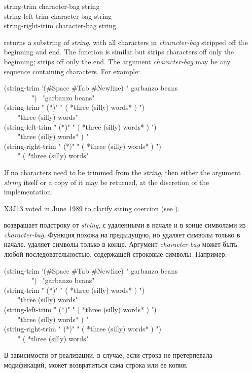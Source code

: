 \begin{defun}[Function]
string-trim character-bag string \\
string-left-trim character-bag string \\
string-right-trim character-bag string

 returns a substring of \emph{string}, with all characters in
\emph{character-bag} stripped off the beginning and end.
The function  is similar but strips characters
off only the beginning;  strips off only the end.
The argument \emph{character-bag} may be any sequence containing
characters.
For example:
\begin{lisp}
(string-trim '(\#{\Xbackslash}Space \#{\Xbackslash}Tab \#{\Xbackslash}Newline) " garbanzo beans \\
~~~~~~~~") \EV\ "garbanzo beans" \\
(string-trim " (*)" " ( *three (silly) words* ) ") \\
~~~\EV\ "three (silly) words" \\
(string-left-trim " (*)" " ( *three (silly) words* ) ") \\
~~~\EV\ "three (silly) words* ) " \\
(string-right-trim " (*)" " ( *three (silly) words* ) ") \\
~~~\EV\ " ( *three (silly) words"
\end{lisp}
If no characters need to be trimmed from the \emph{string},
then either the argument \emph{string} itself or a copy of it may
be returned, at the discretion of the implementation.

\begin{newer}
X3J13 voted in June 1989 
to clarify string coercion (see ).
\end{newer}

 возвращает подстроку от \emph{string}, с удаленными в начале и
в конце символами из \emph{character-bag}.
Функция  похожа на предыдущую, но удаляет символы только в
начале.
 удаляет символы только в
конце.
Аргумент \emph{character-bag} может быть любой последовательностью, содержащей
строковые символы.
Например:
\begin{lisp}
(string-trim '(\#{\Xbackslash}Space \#{\Xbackslash}Tab \#{\Xbackslash}Newline) " garbanzo beans \\
~~~~~~~~") \EV\ "garbanzo beans" \\
(string-trim " (*)" " ( *three (silly) words* ) ") \\
~~~\EV\ "three (silly) words" \\
(string-left-trim " (*)" " ( *three (silly) words* ) ") \\
~~~\EV\ "three (silly) words* ) " \\
(string-right-trim " (*)" " ( *three (silly) words* ) ") \\
~~~\EV\ " ( *three (silly) words"
\end{lisp}
В зависимости от реализации, в случае, если строка не претерпевала модификаций,
может возвратиться сама строка или ее копия.

\end{defun}

